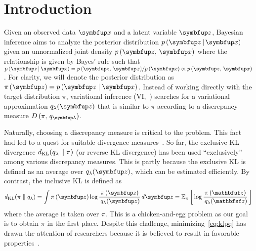 
\section{Introduction}
Given an observed data \(\vx\) and a latent variable \(\vz\), Bayesian inference aims to analyze the posterior distribution \(p\,(\vz\,|\,\vx)\) given an unnormalized joint density \(p\,(\vz,\,\vx)\) where the relationship is given by Bayes' rule such that \(p\,(\vz\,|\,\vx) = {p\,(\vz,\,\vx)}/{p\,(\vx)} \propto p\,(\vz,\,\vx)\).
For clarity, we will denote the posterior distribution as \(\pi\left(\vz\right) = p\,(\vz\mid\vx)\).
Instead of working directly with the target distribution \(\pi\), variational inference (VI,~\citealt{blei_variational_2017}) searches for a variational approximation \(q_{\lambda}(\vz)\) that is similar to \(\pi\) according to a discrepancy measure \(D\,(\pi,\, q_{\vlambda})\).

Naturally, choosing a discrepancy measure is critical to the problem.
This fact had led to a quest for suitable divergence measures~\citep{pmlr-v37-salimans15, NIPS2016_7750ca35, NIPS2017_35464c84, NEURIPS2018_1cd138d0, pmlr-v97-ruiz19a}.
So far, the exclusive KL divergence \(d_{\mathrm{KL}}(q_{\lambda}\parallel\pi)\) (or reverse KL divergence) has been used ``exclusively'' among various discrepancy measures.
This is partly because the exclusive KL is defined as an average over \(q_{\lambda}(\vz)\), which can be estimated efficiently.
By contrast, the inclusive KL is defined as
%
{\small
\vspace{-0.05in}
\begin{align}
  \DKL{\pi}{q_{\lambda}}
  = \int \pi\,(\vz) \log \frac{\pi\left(\vz\right)}{\,q_{\lambda}(\vz)} \,d\vz
  = \Esub{\pi}{\log \frac{\pi\left(\rvvz\right)}{\,q_{\lambda}(\rvvz)} } \label{eq:klpq}
\end{align}
}%
%
where the average is taken over \(\pi\). 
This is a chicken-and-egg problem as our goal is to obtain \(\pi\) in the first place.
Despite this challenge, minimizing~\eqref{eq:klpq} has drawn the attention of researchers because it is believed to result in favorable properties~\citep{minka2005divergence, mackay_local_2001}.

